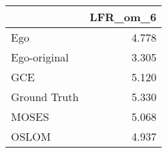 \begin{tabular}{lr}
\toprule
{} & LFR_om_6 \\
\midrule
Ego          &    4.778 \\
Ego-original &    3.305 \\
GCE          &    5.120 \\
Ground Truth &    5.330 \\
MOSES        &    5.068 \\
OSLOM        &    4.937 \\
\bottomrule
\end{tabular}
